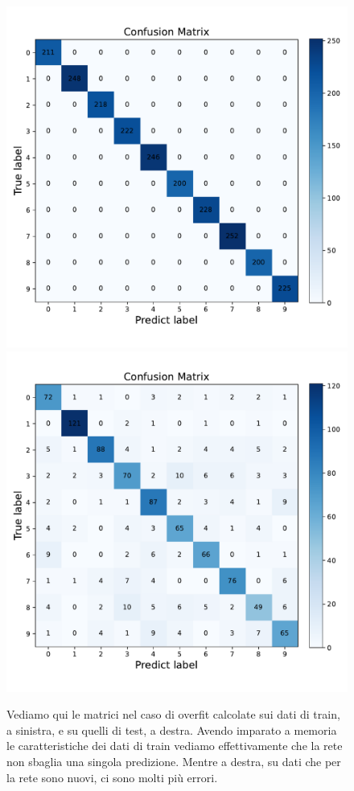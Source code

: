 \documentclass[10pt,a4paper]{article}
\begin{document}
\begin{figure}[h]
\centering
\includegraphics[scale=0.4]{img/conf_mat_over_train.pdf}
\includegraphics[scale=0.4]{img/conf_mat_over_test.pdf}
\caption{Vediamo qui le matrici nel caso di overfit calcolate sui dati di train, a sinistra, e su quelli di test, a destra. Avendo imparato a memoria le caratteristiche dei dati di train vediamo effettivamente che la rete non sbaglia una singola predizione. Mentre a destra, su dati che per la rete sono nuovi, ci sono molti più errori.}
\end{figure}
\end{document}
